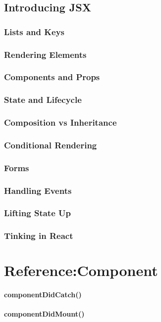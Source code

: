 \documentclass{book}
\begin{document}
\begin{CJK*}{UTF8}{gbsn}
\section{Introducing JSX}
\subsection{Lists and Keys}
\subsection{Rendering Elements}
\subsection{Components and Props}
\subsection{State and Lifecycle}
\subsection{Composition vs Inheritance}
\subsection{Conditional Rendering}
\subsection{Forms}
\subsection{Handling Events}
\subsection{Lifting State Up}
\subsection{Tinking in React}

\chapter{Reference:Component}
\subsubsection{componentDidCatch()}
\subsubsection{componentDidMount()}

\end{CJK*}
\end{document}

